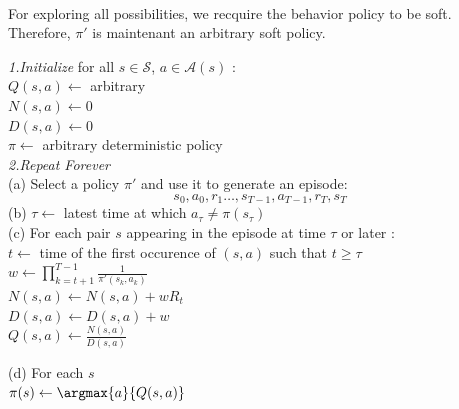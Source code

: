 \documentclass[a4paper]{article}
\begin{document}
{{{{{						\paragraph{} For exploring all possibilities, we recquire the behavior policy to be soft. Therefore, $\pi'$ is maintenant an arbitrary soft policy. 
						\vspace{10pt}
						
						{
						\begin{algorithm}[H]
	 					\SetAlgoLined
						\LinesNumbered
						 \textsf{\emph{1.Initialize }} for all $s\in\mathcal{S}$, $a\in\mathcal{A}(s)$ : \\
						 	\Indp \Indp
								$ Q(s,a) \leftarrow $ arbitrary \\
								$ N(s,a) \leftarrow 0$ \\
								$ D(s,a) \leftarrow 0$ \\
								$\pi \leftarrow$ arbitrary deterministic policy \\
								
							\Indm \Indm 
					 		\BlankLine
							\BlankLine
							\textsf{\emph{2.Repeat Forever }} \\
							\Indp \Indp 
								(a) Select a policy $\pi'$ and use it to generate an episode: 
								$$ s_0, a_0,r_1 \hdots, s_{T-1}, a_{T-1}, r_T, s_T $$
								(b) $\tau \leftarrow$ latest time at which $a_\tau \neq \pi(s_\tau)$ \\
								(c) For each pair $s$ appearing in the episode at time $\tau$ or later : 						\\						
								\Indp \Indp 
								$t\leftarrow$ time of the first occurence of $(s,a)$ such that $t\geq \tau$\\
									$w \leftarrow \prod_{k=t+1}^{T-1}\frac{1}{\pi'(s_k,a_k)}$ \\
									$N(s,a) \leftarrow N(s,a) + wR_t $ \\
									$D(s,a) \leftarrow D(s,a) + w$ \\
									$Q(s,a) \leftarrow \frac{N(s,a)}{D(s,a)}$ 									
									
								\Indm \Indm
								
								(d) For each $s$ \\
								\Indp \Indp 
									$\pi(s) \leftarrow \argmax{a}{Q(s,a)}$
								
								\Indm \Indm 
							
							\Indm \Indm
							\end{algorithm}
						}
					}
				}
			}
			
}}
\end{document}
